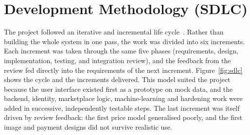 \documentclass[11pt,letterpaper,oneside]{report}
\begin{document}
\section{Development Methodology (SDLC)}
The project followed an iterative and incremental life cycle~\cite{larman}. Rather than building the whole
system in one pass, the work was divided into six increments. Each increment was taken through
the same five phases (requirements, design, implementation, testing, and integration review), and
the feedback from the review fed directly into the requirements of the next increment.
Figure~\ref{fig:sdlc} shows the cycle and the increments delivered. This model suited the project
because the user interface existed first as a prototype on mock data, and the backend, identity,
marketplace logic, machine-learning and hardening work were added in successive, independently
testable steps. The last increment was itself driven by review feedback: the first price model
generalised poorly, and the first image and payment designs did not survive realistic use.
\end{document}
